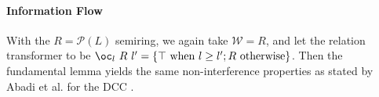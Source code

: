 \vspace{-0.6em}

\paragraph{Information Flow} With the $R = \mathcal{P}(L)$ semiring,
we again take $\mathcal{W} = R$, and let the relation transformer to
be
$\oc_l~R~l' = \{\top~\textrm{when }l \geq l'; R~\textrm{otherwise}\}$.
Then the fundamental lemma yields the same non-interference properties
as stated by Abadi et al. for the DCC \cite{abadi99core}.


